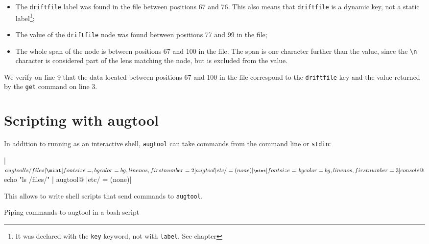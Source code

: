 \begin{itemize}
\item
  The \verb!driftfile! label was found in the file between positions 67 and 76. This also means that \verb!driftfile! is a dynamic key, not a static label\footnote{It was declared with the \verb!key! keyword, not with \verb!label!. See chapter };
\item
  The value of the \verb!driftfile! node was found between positions 77 and 99 in the file;
\item
  The whole span of the node is between positions 67 and 100 in the file. The span is one character further than the value, since the \verb!\n! character is considered part of the lens matching the node, but is excluded from the value.
\end{itemize}

We verify on line 9 that the data located between positions 67 and 100 in the file correspond to the \verb!driftfile! key and the value returned by the \verb!get! command on line 3.


\section{Scripting with augtool}


In addition to running as an interactive shell, \verb!augtool! can take commands from the command line or \verb!stdin!:

 

\consolecode[linenos]|$ augtool ls /files|
\augtoolcode[linenos,firstnumber=2]|etc/ = (none)|
\consolecode[linenos,firstnumber=3]@$ echo "ls /files/" | augtool@
\augtoolcode[linenos,firstnumber=4]|etc/ = (none)|

This allows to write shell scripts that send commands to \verb!augtool!.

  

\begin{listing}
  \caption{Piping commands to augtool in a bash script}
  \label{lst:augtool_wrap}
\end{listing}


\begin{quote}
\end{quote}

